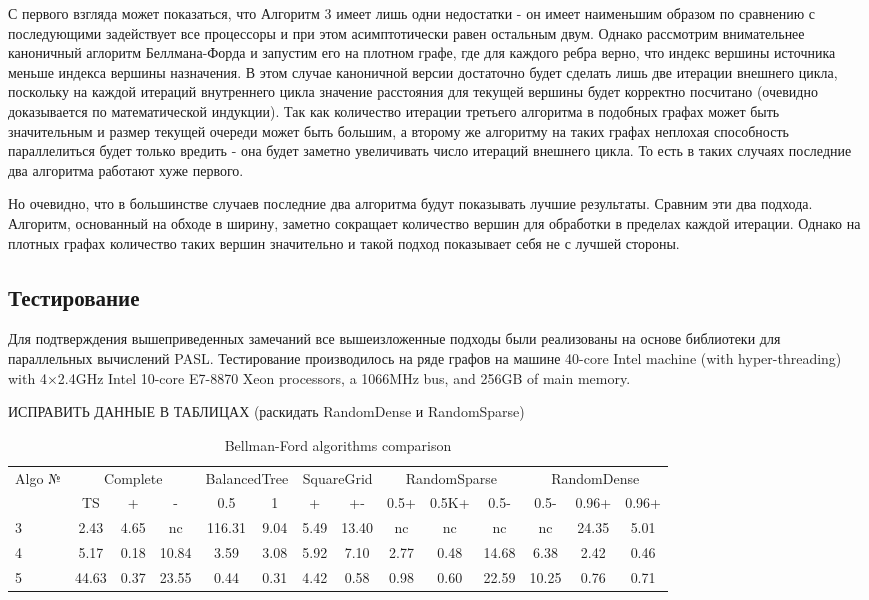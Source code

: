 С первого взгляда может показаться, что Алгоритм 3 имеет лишь одни недостатки - он имеет наименьшим образом по сравнению с последующими задействует все процессоры и при этом асимптотически равен остальным двум. Однако рассмотрим внимательнее каноничный аглоритм Беллмана-Форда и запустим его на плотном графе, где для каждого ребра верно, что индекс вершины источника меньше индекса вершины назначения. В этом случае каноничной версии достаточно будет сделать лишь две итерации внешнего цикла, поскольку на каждой итераций внутреннего цикла значение расстояния для текущей вершины будет корректно посчитано (очевидно доказывается по математической индукции). Так как количество итерации третьего алгоритма в подобных графах может быть значительным и размер текущей очереди может быть большим, а второму же алгоритму на таких графах неплохая способность параллелиться будет только вредить - она будет заметно увеличивать число итераций внешнего цикла. То есть в таких случаях последние два алгоритма работают хуже первого.   

Но очевидно, что в большинстве случаев последние два алгоритма будут показывать лучшие результаты. Сравним эти два подхода. Алгоритм, основанный на обходе в ширину, заметно сокращает количество вершин для обработки в пределах каждой итерации. Однако на плотных графах количество таких вершин значительно и такой подход показывает себя не с лучшей стороны. 

\FloatBarrier
\subsection{Тестирование}

Для подтверждения вышеприведенных замечаний все вышеизложенные подходы были реализованы на основе библиотеки для параллельных вычислений PASL. Тестирование производилось на ряде графов на машине 40-core Intel machine (with hyper-threading) with 4×2.4GHz Intel
10-core E7-8870 Xeon processors, a 1066MHz bus, and 256GB of
main memory. 

ИСПРАВИТЬ ДАННЫЕ В ТАБЛИЦАХ (раскидать RandomDense и RandomSparse)
\begin{table}
\centering

\begin{tabular}{l|ccc|cc|cc|ccc|ccc}  
Algo №& \multicolumn{3}{c}{Complete} & \multicolumn{2}{c}{BalancedTree} & \multicolumn{2}{c}{SquareGrid} & \multicolumn{3}{c}{RandomSparse} & \multicolumn{3}{c}{RandomDense}\\
& TS & + & - & 0.5 & 1 & + & +- & 0.5+ & 0.5K+ & 0.5- & 0.5- & 0.96+ & 0.96+\\
\hline\hline
3 & 2.43 & 4.65 & nc & 116.31 & 9.04 & 5.49 & 13.40 & nc & nc & nc & nc & 24.35 & 5.01 \\  
4 & 5.17 & 0.18 & 10.84 & 3.59 & 3.08 & 5.92 & 7.10 & 2.77 & 0.48 & 14.68 & 6.38 & 2.42 & 0.46 \\
5 & 44.63 & 0.37 & 23.55 & 0.44 & 0.31 & 4.42 & 0.58 & 0.98 & 0.60 & 22.59 & 10.25 & 0.76 & 0.71 \\
\hline
\end{tabular}

\caption{Bellman-Ford algorithms comparison}
\label{graph_description}
\end{table}

